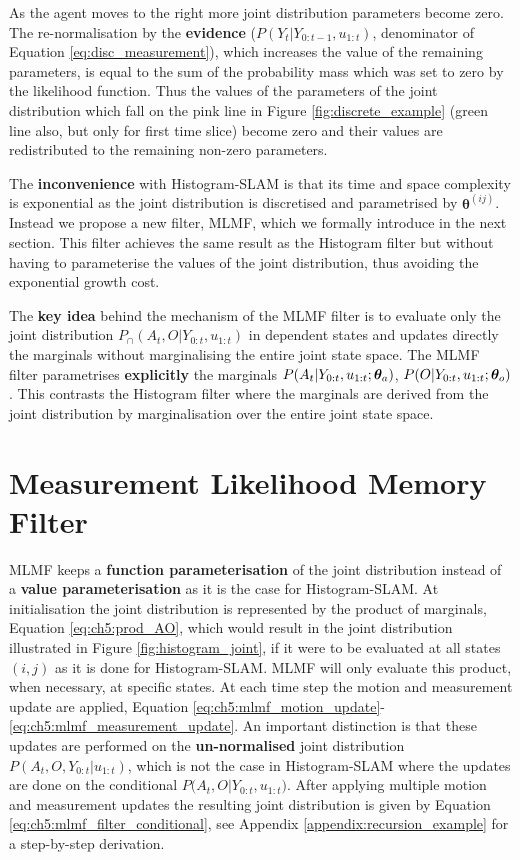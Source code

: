 As the agent moves to the right more joint distribution parameters become zero. The re-normalisation by the \textbf{evidence} ($P(Y_t|Y_{0:t-1},u_{1:t})$, denominator of Equation \ref{eq:disc_measurement}), 
which increases the value of the remaining parameters, is equal to the sum of the probability mass which was set to zero by the likelihood function.
Thus the values of the parameters of the joint distribution which fall on the pink line in Figure \ref{fig:discrete_example} 
(green line also, but only for first time slice) become zero and their values are redistributed to the remaining non-zero parameters. 

The \textbf{inconvenience} with Histogram-SLAM is that its time and space complexity is exponential as the joint distribution is discretised and 
parametrised by $\boldsymbol{\theta}^{(ij)}$. Instead we propose a new filter, MLMF, which we formally introduce in the next section. This filter
achieves the same result as the Histogram filter but without having to parameterise the values of the joint distribution, thus avoiding the exponential growth cost. 

The \textbf{key idea} behind the mechanism of the MLMF filter is to evaluate only the joint distribution $P_{\cap}(A_t,O|Y_{0:t},u_{1:t})$ in
dependent states and updates directly the marginals without marginalising the entire joint state space.
The MLMF filter parametrises \textbf{explicitly} the marginals ${P(A_t|Y_{0:t},u_{1:t};\boldsymbol{\theta}_a)}$, ${P(O|Y_{0:t},u_{1:t};\boldsymbol{\theta}_o)}$. 
This contrasts the Histogram filter where the marginals are derived from the joint distribution by marginalisation over the entire joint state space. 


\FloatBarrier
\section{Measurement Likelihood Memory Filter}\label{ch5:MLMF}

MLMF keeps a  \textbf{function parameterisation} of the joint distribution instead of a \textbf{value parameterisation} as it is the case 
for Histogram-SLAM. At initialisation the joint distribution is represented by the product of marginals, Equation \ref{eq:ch5:prod_AO}, which 
would result in the joint distribution illustrated in Figure \ref{fig:histogram_joint}, if it were to be evaluated at all states $(i,j)$
as it is done for Histogram-SLAM. MLMF will only evaluate this product, when necessary, at specific states. 
At each time step the motion and measurement update are applied, Equation \ref{eq:ch5:mlmf_motion_update}-\ref{eq:ch5:mlmf_measurement_update}.
An important distinction is that these updates are performed on the \textbf{un-normalised} joint distribution ${P(A_t,O,Y_{0:t}|u_{1:t})}$, which is not the case in Histogram-SLAM where 
the updates are done on the conditional ${P(A_t,O|Y_{0:t},u_{1:t}})$. After applying multiple 
motion and measurement updates the resulting joint distribution is given by Equation \ref{eq:ch5:mlmf_filter_conditional}, see Appendix \ref{appendix:recursion_example}
for a step-by-step derivation. 

